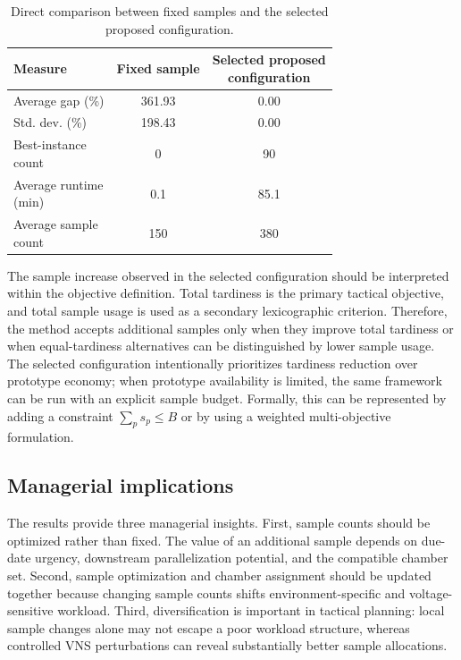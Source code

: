 \documentclass[11pt]{article}
\newcommand{\compacttable}{%
  \footnotesize
  \setlength{\tabcolsep}{2.8pt}%
  \renewcommand{\arraystretch}{0.86}%
}
\begin{document}
\begin{table}[H]
\centering
\caption{Direct comparison between fixed samples and the selected proposed configuration.}
\label{tab:fixed_selected_sample_comparison_short}
\compacttable
\begin{tabular}{lcc}
\hline
\textbf{Measure}
& \textbf{Fixed sample}
& \shortstack{\textbf{Selected proposed}\\\textbf{configuration}} \\
\hline
Average gap (\%) & 361.93 & 0.00 \\
Std. dev. (\%) & 198.43 & 0.00 \\
\shortstack[l]{Best-instance\\count} & 0 & 90 \\
\shortstack[l]{Average runtime\\(min)} & 0.1 & 85.1 \\
\shortstack[l]{Average sample\\count} & 150 & 380 \\
\hline
\end{tabular}
\end{table}

The sample increase observed in the selected configuration should be interpreted within the objective definition. Total tardiness is the primary tactical objective, and total sample usage is used as a secondary lexicographic criterion. Therefore, the method accepts additional samples only when they improve total tardiness or when equal-tardiness alternatives can be distinguished by lower sample usage. The selected configuration intentionally prioritizes tardiness reduction over prototype economy; when prototype availability is limited, the same framework can be run with an explicit sample budget. Formally, this can be represented by adding a constraint \(\sum_p s_p\le B\) or by using a weighted multi-objective formulation.

\subsection{Managerial implications}
\label{subsec:managerial}

The results provide three managerial insights. First, sample counts should be optimized rather than fixed. The value of an additional sample depends on due-date urgency, downstream parallelization potential, and the compatible chamber set. Second, sample optimization and chamber assignment should be updated together because changing sample counts shifts environment-specific and voltage-sensitive workload. Third, diversification is important in tactical planning: local sample changes alone may not escape a poor workload structure, whereas controlled VNS perturbations can reveal substantially better sample allocations.
\end{document}

